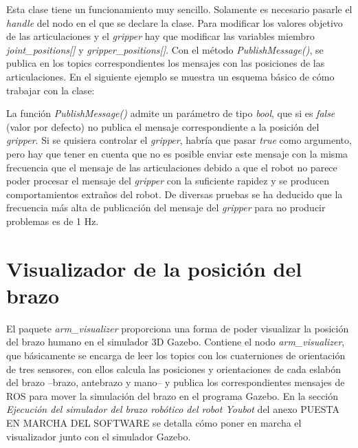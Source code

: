 \documentclass[12pt, a4paper]{report}
\begin{document}
Esta clase tiene un funcionamiento muy sencillo. Solamente es necesario pasarle el \textit{handle} del nodo en el que se declare la clase. Para modificar los valores objetivo de las articulaciones y el \textit{gripper} hay que modificar las variables miembro \textit{joint\_positions[]} y \textit{gripper\_positions[]}. Con el método \textit{PublishMessage()}, se publica en los topics correspondientes los mensajes con las posiciones de las articulaciones. En el siguiente ejemplo se muestra un esquema básico de cómo trabajar con la clase:\\

\lstset{inputencoding=utf8/latin1}


La función \textit{PublishMessage()} admite un parámetro de tipo \textit{bool}, que si es \textit{false} (valor por defecto) no publica el mensaje correspondiente a la posición del \textit{gripper}. Si se quisiera controlar el \textit{gripper}, habría que pasar \textit{true} como argumento, pero hay que tener en cuenta que no es posible enviar este mensaje con la misma frecuencia que el mensaje de las articulaciones debido a que el robot no parece poder procesar el mensaje del \textit{gripper} con la suficiente rapidez y se producen comportamientos extraños del robot. De diversas pruebas se ha deducido que la frecuencia más alta de publicación del mensaje del \textit{gripper} para no producir problemas es de 1 Hz.

\section{Visualizador de la posición del brazo}

El paquete \textit{arm\_visualizer} proporciona una forma de poder visualizar la posición del brazo humano en el simulador 3D Gazebo. Contiene el nodo \textit{arm\_visualizer}, que básicamente se encarga de leer los topics con los cuaterniones de orientación de tres sensores, con ellos calcula las posiciones y orientaciones de cada eslabón del brazo --brazo, antebrazo y mano-- y publica los correspondientes mensajes de ROS para mover la simulación del brazo en el programa Gazebo. En la sección \textit{Ejecución del simulador del brazo robótico del robot Youbot} del anexo PUESTA EN MARCHA DEL SOFTWARE se detalla cómo poner en marcha el visualizador junto con el simulador Gazebo.
\end{document}

